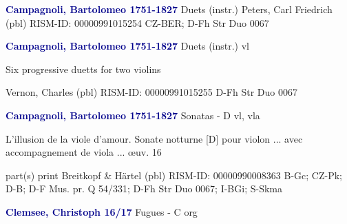 \documentclass[twocolumn]{book}
\begin{document}
\newline \par \vspace{7pt} \textcolor{darkblue}{\textbf{Campagnoli, Bartolomeo  1751-1827}}
\newline Duets (instr.)
\newline Peters, Carl Friedrich  (pbl)
\newline RISM-ID: 00000991015254
\newline CZ-BER; D-Fh  Str Duo 0067
\newline \par \vspace{7pt} \textcolor{darkblue}{\textbf{Campagnoli, Bartolomeo  1751-1827}}
\newline Duets (instr.)
 vl
\newline \begin{itshape}Six progressive duetts for two violins\end{itshape} 
\newline Vernon, Charles  (pbl)
\newline RISM-ID: 00000991015255
\newline D-Fh  Str Duo 0067
\newline \par \vspace{7pt} \textcolor{darkblue}{\textbf{Campagnoli, Bartolomeo  1751-1827}}
\newline Sonatas - D
\newline vl, vla
\newline \begin{itshape}L'illusion de la viole d'amour. Sonate notturne [D] pour violon ... avec accompagnement de viola ... œuv. 16\end{itshape} 
\newline \textcolor{darkblue}{}  part(s)
\newline print
\newline Breitkopf \& Härtel  (pbl)
\newline RISM-ID: 00000990008363
\newline B-Gc; CZ-Pk; D-B; D-F  Mus. pr. Q 54/331; D-Fh  Str Duo 0067; I-BGi; S-Skma
\newline \par \vspace{7pt} \textcolor{darkblue}{\textbf{Clemsee, Christoph  16/17}}
\newline Fugues - C
\newline org
\end{document}
